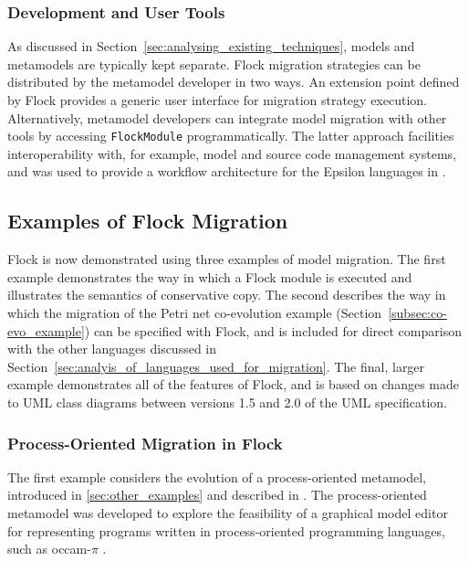  
\subsubsection{Development and User Tools}
As discussed in Section~\ref{sec:analysing_existing_techniques}, models and metamodels are typically kept separate. Flock migration strategies can be distributed by the metamodel developer in two ways. An extension point defined by Flock provides a generic user interface for migration strategy execution. Alternatively, metamodel developers can integrate model migration with other tools by accessing \texttt{FlockModule} programmatically. The latter approach facilities interoperability with, for example, model and source code management systems, and was used to provide a workflow architecture for the Epsilon languages in \cite{kolovos09thesis}.


\subsection{Examples of Flock Migration}
\label{subsec:flock_examples}
Flock is now demonstrated using three examples of model migration. The first example demonstrates the way in which a Flock module is executed and illustrates the semantics of conservative copy. The second describes the way in which the migration of the Petri net co-evolution example (Section~\ref{subsec:co-evo_example}) can be specified with Flock, and is included for direct comparison with the other languages discussed in Section~\ref{sec:analyis_of_languages_used_for_migration}. The final, larger example demonstrates all of the features of Flock, and is based on changes made to UML class diagrams between versions 1.5 and 2.0 of the UML specification.

\subsubsection{Process-Oriented Migration in Flock}
The first example considers the evolution of a process-oriented metamodel, introduced in \ref{sec:other_examples} and described in . The process-oriented metamodel was developed to explore the feasibility of a graphical model editor for representing programs written in process-oriented programming languages, such as occam-$\pi$ \cite{occam_pi}.

